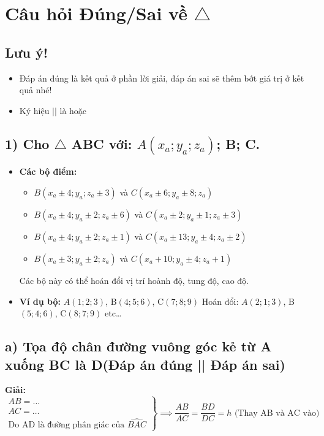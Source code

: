 \documentclass{article}
\newcommand{\triangleeq}{\ensuremath{\triangle}} %
\begin{document}
\section*{Câu hỏi Đúng/Sai về $\triangleeq$}

\subsection*{Lưu ý!}
\begin{itemize}
    \item Đáp án đúng là kết quả ở phần lời giải, đáp án sai sẽ thêm bớt giá trị ở kết quả nhé!
    \item Ký hiệu $||$ là hoặc
\end{itemize}

\subsection*{1) Cho $\triangleeq$ ABC với: $A(x_a; y_a; z_a)$; B; C.}

\begin{itemize}
    \item \textbf{Các bộ điểm:}
    \begin{itemize}
        \item $B(x_a \pm 4; y_a; z_a \pm 3)$ và $C(x_a \pm 6; y_a \pm 8; z_a)$
        \item $B(x_a \pm 4; y_a \pm 2; z_a \pm 6)$ và $C(x_a \pm 2; y_a \pm 1; z_a \pm 3)$
        \item $B(x_a \pm 4; y_a \pm 2; z_a \pm 1)$ và $C(x_a \pm 13; y_a \pm 4; z_a \pm 2)$
        \item $B(x_a \pm 3; y_a \pm 2; z_a)$ và $C(x_a + 10; y_a \pm 4; z_a + 1)$
    \end{itemize}
    Các bộ này có thể hoán đổi vị trí hoành độ, tung độ, cao độ.

    \item \textbf{Ví dụ bộ:} $A(1;2;3)$, B$(4;5;6)$, C$(7;8;9)$
    Hoán đổi: $A(2;1;3)$, B$(5;4;6)$, C$(8;7;9)$ etc\dots
\end{itemize}

\subsection*{a) Tọa độ chân đường vuông góc kẻ từ A xuống BC là D(Đáp án đúng || Đáp án sai)}

\textbf{Giải:}
\[
\left.
\begin{array}{l}
AB = \ldots \\
AC = \ldots \\
\text{Do AD là đường phân giác của } \widehat{BAC}
\end{array}
\right\}
\implies \frac{AB}{AC} = \frac{BD}{DC} = h \text{ (Thay AB và AC vào)}
\]
\end{document}
